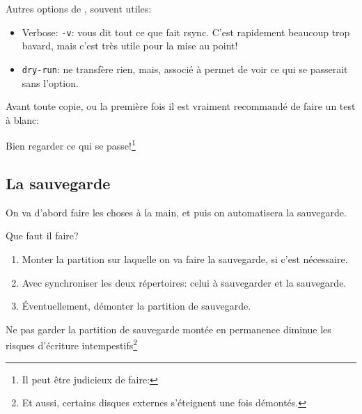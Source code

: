   Autres options de , souvent utiles:

  \begin{itemize}
    \item Verbose: \texttt{-v}: vous dit tout ce que fait rsync. C'est
      rapidement beaucoup trop bavard, mais c'est très utile pour la
      mise au point!

    \item \texttt{\tirr dry-run}: ne transfère rien, mais, associé à
        permet de voir ce qui se passerait sans l'option.
  \end{itemize}

  Avant toute copie, ou la première fois il est \large{vraiment}
  recommandé de faire un test à blanc:


  Bien regarder ce qui se passe!\footnote{Il peut être judicieux de
    faire: }
    
\subsection{La sauvegarde} On va d'abord faire les choses \og à la
main\fg{}, et puis on automatisera la sauvegarde.

Que faut il faire?

\begin{enumerate}
  \item Monter la partition sur laquelle on va faire la sauvegarde, si
    c'est nécessaire.
  \item Avec  synchroniser les deux répertoires: celui à
    sauvegarder et la sauvegarde.
  \item Éventuellement, démonter la partition de sauvegarde.
\end{enumerate}

Ne pas garder la partition de sauvegarde montée en permanence diminue
les risques d'écriture intempestifs\footnote{Et aussi, certains
  disques externes s'éteignent une fois démontés.}


